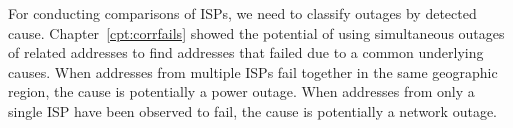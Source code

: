 For conducting comparisons of ISPs, we need to
classify outages by detected cause. Chapter~\ref{cpt:corrfails} showed
the potential of using simultaneous outages of related addresses to
find addresses that failed due to a common underlying causes. When
addresses from multiple ISPs fail together in the same geographic
region, the cause is potentially a power outage. When addresses from
only a single ISP have been observed to fail, the cause is potentially
a network outage. %




 








